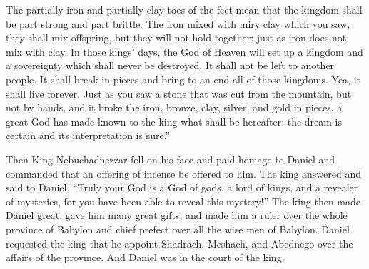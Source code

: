 \begin{inparaenum}
     The partially iron and partially clay toes of the feet mean that the kingdom shall be part strong and part brittle.%
     The iron mixed with miry clay which you saw, they shall mix offspring, but they will not hold together: just as iron does not mix with clay.%
     In those kings' days, the God of Heaven will set up a kingdom and a sovereignty which shall never be destroyed. It shall not be left to another people. It shall break in pieces and bring to an end all of those kingdoms. Yea, it shall live forever.%
     Just as you saw a stone that was cut from the mountain, but not by hands, and it broke the iron, bronze, clay, silver, and gold in pieces, a great God has made known to the king what shall be hereafter: the dream is certain and its interpretation is sure.''%
    
     Then King Nebuchadnezzar fell on his face and paid homage to Daniel and commanded that an offering of incense be offered to him.%
     The king answered and said to Daniel, ``Truly your God is a God of gods, a lord of kings, and a revealer of mysteries, for you have been able to reveal this mystery!''%
     The king then made Daniel great, gave him many great gifts, and made him a ruler over the whole province of Babylon and chief prefect over all the wise men of Babylon.%
     Daniel requested the king that he appoint Shadrach, Meshach, and Abednego over the affairs of the province. And Daniel was in the court of the king.%
\end{inparaenum}
